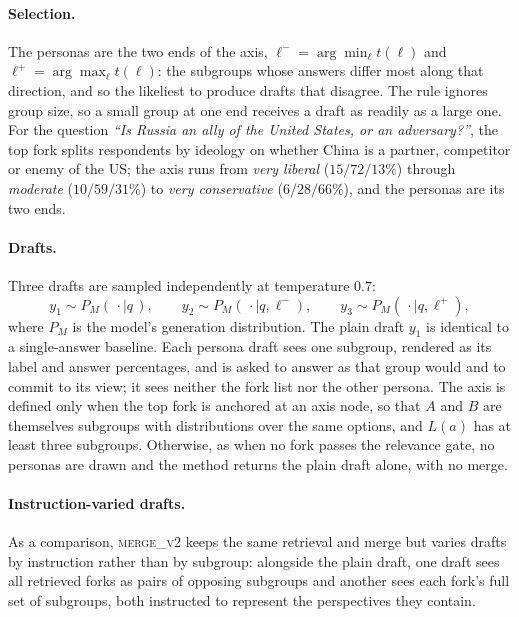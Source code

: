 \documentclass[11pt]{article}
\begin{document}
\paragraph{Selection.}
The personas are the two ends of the axis,
$\ell^{-} = \arg\min_{\ell} t(\ell)$ and $\ell^{+} = \arg\max_{\ell} t(\ell)$:
the subgroups whose answers differ most along that direction, and so the
likeliest to produce drafts that disagree. The rule ignores group size, so a
small group at one end receives a draft as readily as a large one. For the
question \emph{``Is Russia an ally of the United States, or an adversary?''},
the top fork splits respondents by ideology on whether China is a partner,
competitor or enemy of the US; the axis runs from \emph{very liberal}
($15/72/13\%$) through \emph{moderate} ($10/59/31\%$) to \emph{very
conservative} ($6/28/66\%$), and the personas are its two ends.

\paragraph{Drafts.}
Three drafts are sampled independently at temperature $0.7$:
\begin{equation}
  y_1 \sim P_M(\,\cdot \mid q\,), \qquad
  y_2 \sim P_M(\,\cdot \mid q, \ell^{-}), \qquad
  y_3 \sim P_M(\,\cdot \mid q, \ell^{+}),
\end{equation}
where $P_M$ is the model's generation distribution. The plain draft $y_1$ is
identical to a single-answer baseline. Each persona draft sees one subgroup,
rendered as its label and answer percentages, and is asked to answer as that
group would and to commit to its view; it sees neither the fork list nor the
other persona. The axis is defined only when the top fork is anchored at an
axis node, so that $A$ and $B$ are themselves subgroups with distributions over
the same options, and $L(a)$ has at least three subgroups. Otherwise, as when
no fork passes the relevance gate, no personas are drawn and the method returns
the plain draft alone, with no merge.

\paragraph{Instruction-varied drafts.}
As a comparison, \textsc{merge\_v2} keeps the same retrieval and merge but
varies drafts by instruction rather than by subgroup: alongside the plain
draft, one draft sees all retrieved forks as pairs of opposing subgroups and
another sees each fork's full set of subgroups, both instructed to represent
the perspectives they contain.
\end{document}
